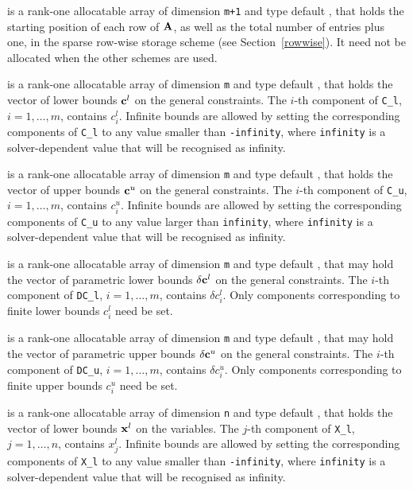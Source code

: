 \documentclass{galahad}
\begin{document}
\begin{description}
\begin{description}
 is a rank-one allocatable array of dimension {\tt m+1} and type 
default \integer, that holds the 
starting position of each row of ${\mathbf{A}}$, as well
as the total number of entries plus one, in the sparse row-wise storage
scheme (see Section~\ref{rowwise}). It need not be allocated when the
other schemes are used.

\end{description}

 is a rank-one allocatable array of dimension {\tt m} and type 
default \realdp, that holds the vector of lower bounds ${\mathbf{c}}^{l}$ 
on the general constraints. The $i$-th component of 
{\tt C\_l}, $i = 1, \ldots , m$, contains $c_{i}^{l}$.
Infinite bounds are allowed by setting the corresponding 
components of {\tt C\_l} to any value smaller than {\tt -infinity}, 
where {\tt infinity} is a  solver-dependent value that will be recognised as
infinity.

 is a rank-one allocatable array of dimension {\tt m} and type 
default \realdp, that holds the vector of upper bounds ${\mathbf{c}}^{u}$ 
on the general constraints. The $i$-th component of 
{\tt C\_u}, $i = 1,  \ldots ,  m$, contains $c_{i}^{u}$.
Infinite bounds are allowed by setting the corresponding 
components of {\tt C\_u} to any value larger than {\tt infinity}, 
where {\tt infinity} is a  solver-dependent value that will be recognised as
infinity.

 is a rank-one allocatable array of dimension {\tt m} and type 
default \realdp, that may hold the vector of parametric lower bounds 
$\delta {\mathbf{c}}^{l}$ on the general constraints. The $i$-th component of 
{\tt DC\_l}, $i = 1, \ldots , m$, contains $\delta c_{i}^{l}$.
Only components corresponding to finite lower bounds $c_{i}^{l}$
need be set.

 is a rank-one allocatable array of dimension {\tt m} and type 
default \realdp, that may hold the vector of parametric upper bounds 
$\delta {\mathbf{c}}^{u}$  on the general constraints. The $i$-th component of 
{\tt DC\_u}, $i = 1,  \ldots ,  m$, contains $\delta c_{i}^{u}$.
Only components corresponding to finite upper bounds $c_{i}^{u}$
need be set.

 is a rank-one allocatable array of dimension {\tt n} and type 
default \realdp, that holds
the vector of lower bounds ${\mathbf{x}}^{l}$ on the variables.
The $j$-th component of {\tt X\_l}, $j = 1, \ldots , n$, 
contains $x_{j}^{l}$.
Infinite bounds are allowed by setting the corresponding 
components of {\tt X\_l} to any value smaller than {\tt -infinity}, 
where {\tt infinity} is a  solver-dependent value that will be recognised as
infinity.


\end{description}
\end{document}
